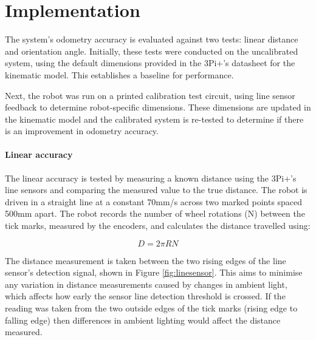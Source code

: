 \documentclass[conference]{IEEEtran}
\begin{document}



\section{Implementation}\label{sec:implementation}

The system's odometry accuracy is evaluated against two tests: linear distance and orientation angle. 
Initially, these tests were conducted on the uncalibrated system, using the default dimensions provided in the 3Pi+’s datasheet for the kinematic model. This establishes a baseline for performance.

Next, the robot was run on a printed calibration test circuit, using line sensor feedback to determine robot-specific dimensions. 
These dimensions are updated in the kinematic model \cite{paul} and the calibrated system is re-tested to determine if there is an improvement in odometry accuracy.

\paragraph{Linear accuracy} The linear accuracy is tested by measuring a known distance using the 3Pi+'s line sensors and comparing the measured value to the true distance.
The robot is driven in a straight line at a constant 70mm/s across two marked points spaced 500mm apart.
The robot records the number of wheel rotations (N) between the tick marks, measured by the encoders, and calculates the distance travelled using:

\begin{equation}
    D = 2 \pi R N
\end{equation}

The distance measurement is taken between the two rising edges of the line sensor's detection signal, shown in Figure \ref{fig:linesensor}.
This aims to minimise any variation in distance measurements caused by changes in ambient light, which affects how early the sensor line detection threshold is crossed.
If the reading was taken from the two outside edges of the tick marks (rising edge to falling edge) then differences in ambient lighting would affect the distance measured.
\end{document}
